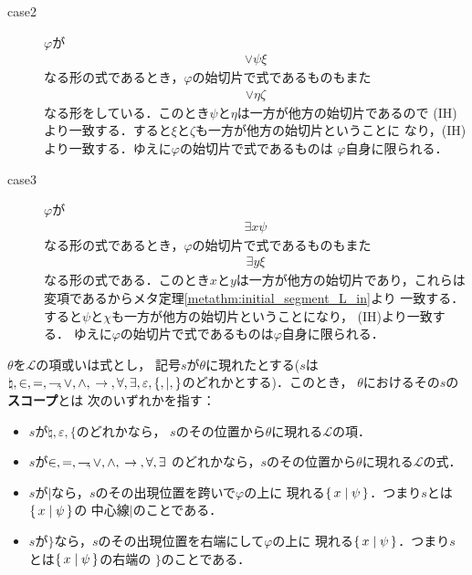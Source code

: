 \begin{metaprf}
\begin{description}
\begin{description}
					\item[case2] $\varphi$が
						\begin{align}
							\vee \psi \xi
						\end{align}
						なる形の式であるとき，$\varphi$の始切片で式であるものもまた
						\begin{align}
							\vee \eta \zeta
						\end{align}
						なる形をしている．このとき$\psi$と$\eta$は一方が他方の始切片であるので
						(IH)より一致する．すると$\xi$と$\zeta$も一方が他方の始切片ということに
						なり，(IH)より一致する．ゆえに$\varphi$の始切片で式であるものは
						$\varphi$自身に限られる．
						
					\item[case3] $\varphi$が
						\begin{align}
							\exists x \psi
						\end{align}
						なる形の式であるとき，$\varphi$の始切片で式であるものもまた
						\begin{align}
							\exists y \xi
						\end{align}
						なる形の式である．このとき$x$と$y$は一方が他方の始切片であり，これらは
						変項であるからメタ定理\ref{metathm:initial_segment_L_in}より
						一致する．すると$\psi$と$\chi$も一方が他方の始切片ということになり，
						(IH)より一致する．
						ゆえに$\varphi$の始切片で式であるものは$\varphi$自身に限られる．
						\QED
				\end{description}
		\end{description}
	\end{metaprf}
	
	\begin{screen}
		\begin{metadfn}
		\label{metadfn:L_epsilon_scope}
			$\theta$を$\mathcal{L}$の項或いは式とし，
			記号$s$が$\theta$に現れたとする($s$は$\natural,\in,=,\rightharpoondown\hspace{-0.25em},\vee,\wedge,
			\hspace{0.25em}\rightarrow\hspace{0.25em},\forall,\exists,\varepsilon,\{,|,\}$のどれかとする)．このとき，
			$\theta$におけるその$s$の{\bf スコープ}とは
			次のいずれかを指す：
			\begin{itemize}
				\item $s$が$\natural,\varepsilon,\{$のどれかなら，
					$s$のその位置から$\theta$に現れる$\mathcal{L}$の項．
				\item $s$が$\in,=,\rightharpoondown\hspace{-0.25em},\vee,\wedge,\hspace{0.25em}\rightarrow\hspace{0.25em},\forall,\exists$
					のどれかなら，$s$のその位置から$\theta$に現れる$\mathcal{L}$の式．
				\item $s$が$|$なら，$s$のその出現位置を跨いで$\varphi$の上に
					現れる$\{\, x \mid \psi\, \}$．つまり$s$とは$\{\, x \mid \psi\, \}$の
					中心線$|$のことである．
				\item $s$が$\}$なら，$s$のその出現位置を右端にして$\varphi$の上に
					現れる$\{\, x \mid \psi\, \}$．つまり$s$とは$\{\, x \mid \psi\, \}$の右端の
					$\}$のことである．
			\end{itemize}
		\end{metadfn}
	\end{screen}
	
